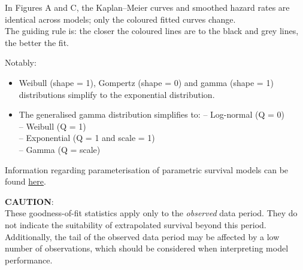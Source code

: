 \documentclass[
]{article}
\providecommand{\tightlist}{%
  \setlength{\itemsep}{0pt}\setlength{\parskip}{0pt}}
\begin{document}
In Figures A and C, the Kaplan--Meier curves and smoothed hazard rates
are identical across models; only the coloured fitted curves change.\\
The guiding rule is: the closer the coloured lines are to the black and
grey lines, the better the fit.

Notably:

\begin{itemize}
\tightlist
\item
  Weibull (shape = 1), Gompertz (shape = 0) and gamma (shape = 1)
  distributions simplify to the exponential distribution.\\
\item
  The generalised gamma distribution simplifies to: -- Log-normal (Q =
  0)\\
  -- Weibull (Q = 1)\\
  -- Exponential (Q = 1 and scale = 1)\\
  -- Gamma (Q = scale)
\end{itemize}

Information regarding parameterisation of parametric survival models can
be found
\href{https://devinincerti.com/code/survival-distributions.html}{here}.

\textbf{CAUTION}:\\
These goodness-of-fit statistics apply only to the \emph{observed} data
period. They do not indicate the suitability of extrapolated survival
beyond this period. Additionally, the tail of the observed data period
may be affected by a low number of observations, which should be
considered when interpreting model performance.

\clearpage

\begin{table}[H]
\centering
\caption{\label{tab:Table_2}Goodness of fit statistics}
\centering
{}
\end{table}
\end{document}
